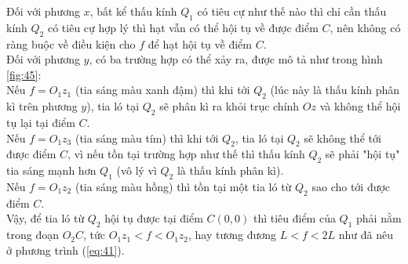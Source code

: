 \begin{enumerate}
\begin{enumerate}
    Đối với phương $x$, bất kể thấu kính $Q_1$ có tiêu cự như thế nào thì chỉ cần thấu kính $Q_2$ có tiêu cự hợp lý thì hạt vẫn có thể hội tụ về được điểm $C$, nên không có ràng buộc về điều kiện cho $f$ để hạt hội tụ về điểm $C$. \\

    Đối với phương $y$, có ba trường hợp có thể xảy ra, được mô tả như trong hình \ref{fig:45}: \\
    
    Nếu $f = O_1z_1$ (tia sáng màu xanh đậm) thì khi tới $Q_2$ (lúc này là thấu kính phân kì trên phương $y$), tia ló tại $Q_2$ sẽ phân kì ra khỏi trục chính $Oz$ và không thể hội tụ lại tại điểm $C$. \\

    Nếu $f = O_1z_3$ (tia sáng màu tím) thì khi tới $Q_2$, tia ló tại $Q_2$ sẽ không thể tới được điểm $C$, vì nếu tồn tại trường hợp như thế thì thấu kính $Q_2$ sẽ phải "hội tụ" tia sáng mạnh hơn $Q_1$ (vô lý vì $Q_2$ là thấu kính phân kì). \\

    Nếu $f = O_1 z_2$ (tia sáng màu hồng) thì tồn tại một tia ló từ $Q_2$ sao cho tới được điểm $C$. \\

    Vậy, để tia ló từ $Q_2$ hội tụ được tại điểm $C(0,0)$ thì tiêu điểm của $Q_1$ phải nằm trong đoạn $O_2 C$, tức $O_1 z_1 < f < O_1 z_2$, hay tương đương $L < f < 2L$ như đã nêu ở phương trình (\ref{eq:41}).

    \begin{figure}[!ht]
        \centering
        \scalebox{0.9}{
        \begin{tikzpicture}[x=0.75pt,y=0.75pt,yscale=-1,xscale=1]
        

\end{tikzpicture}}
\end{figure}
\end{enumerate}
\end{enumerate}
